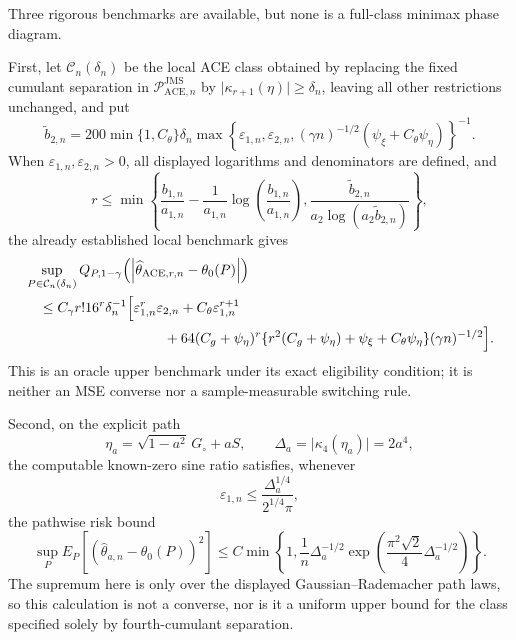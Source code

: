 Three rigorous benchmarks are available, but none is a full-class minimax phase diagram.

First, let \(\mathcal C_n(\delta_n)\) be the local ACE class obtained by replacing the fixed cumulant separation in \(\mathcal P_{\mathrm{ACE},n}^{\mathrm{JMS}}\) by \(\lvert\kappa_{r+1}(\eta)\rvert\ge\delta_n\), leaving all other restrictions unchanged, and put
\[
 \widetilde b_{2,n}
 =200\min\{1,C_{\theta}\}\delta_n
 \max\!\left\{
   \varepsilon_{1,n},\varepsilon_{2,n},
   (\gamma n)^{-1/2}(\psi_{\xi}+C_{\theta}\psi_{\eta})
 \right\}^{-1}.
\]
When \(\varepsilon_{1,n},\varepsilon_{2,n}>0\), all displayed logarithms and denominators are defined, and
\[
 r\le
 \min\!\left\{
   \frac{b_{1,n}}{a_{1,n}}
   -\frac{1}{a_{1,n}}\log\!\left(\frac{b_{1,n}}{a_{1,n}}\right),
   \frac{\widetilde b_{2,n}}{a_2\log(a_2\widetilde b_{2,n})}
 \right\},
\]
the already established local benchmark gives
\[
\begin{aligned}
 &\sup_{P\in\mathcal C_n(\delta_n)}
 Q_{P,1-\gamma}
 \!\left(\left|\widehat\theta_{\mathrm{ACE},r,n}-\theta_0(P)\right|\right)\\
 &\quad\le
 C_{\gamma}r!16^r\delta_n^{-1}
 \Bigl[
   \varepsilon_{1,n}^r\varepsilon_{2,n}
   +C_{\theta}\varepsilon_{1,n}^{r+1}\\
 &\hspace{35mm}
   +64(C_g+\psi_{\eta})^r
    \{r^2(C_g+\psi_{\eta})+\psi_{\xi}+C_{\theta}\psi_{\eta}\}
    (\gamma n)^{-1/2}
 \Bigr].
\end{aligned}
\]
This is an oracle upper benchmark under its exact eligibility condition; it is neither an MSE converse nor a sample-measurable switching rule.

Second, on the explicit path
\[
 \eta_a=\sqrt{1-a^2}\,G_{\circ}+aS,
 \qquad
 \Delta_a=\lvert\kappa_4(\eta_a)\rvert=2a^4,
\]
the computable known-zero sine ratio satisfies, whenever
\[
 \varepsilon_{1,n}\le
 \frac{\Delta_a^{1/4}}{2^{1/4}\pi},
\]
the pathwise risk bound
\[
 \sup_P E_P[(\widehat\theta_{a,n}-\theta_0(P))^2]
 \le
 C\min\!\left\{
  1,
  \frac{1}{n}\Delta_a^{-1/2}
  \exp\!\left(\frac{\pi^2\sqrt2}{4}\Delta_a^{-1/2}\right)
 \right\}.
\]
The supremum here is only over the displayed Gaussian--Rademacher path laws, so this calculation is not a converse, nor is it a uniform upper bound for the class specified solely by fourth-cumulant separation.

